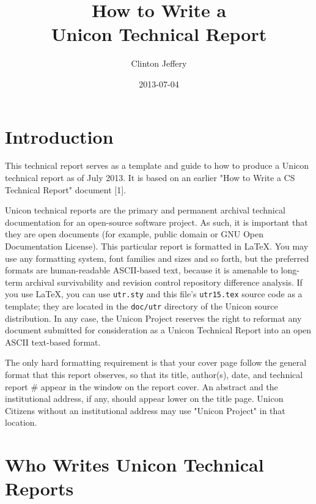\documentclass[letterpaper,12pt]{article}
\title{How to Write a \\ Unicon Technical Report}
\author{Clinton Jeffery}
\date{2013-07-04}
\begin{document}
\maketitle

\section{Introduction}

This technical report serves as a template and guide to how to produce
a Unicon technical report as of July 2013. It is based on an earlier
"How to Write a CS Technical Report" document [1].

Unicon technical reports are the primary and permanent archival
technical documentation for an open-source software project. As such,
it is important that they are open documents (for example, public
domain or GNU Open Documentation License).  This particular report is
formatted in LaTeX. You may use any formatting system, font families
and sizes and so forth, but the preferred formats are human-readable
ASCII-based text, because it is amenable to long-term archival
survivability and revision control repository difference analysis.
If you use LaTeX, you can use \texttt{utr.sty} and this file's
\texttt{utr15.tex} source code as a template; they are located in the
\texttt{doc/utr} directory of the Unicon source distribution.  In any
case, the Unicon Project reserves the right to reformat any document
submitted for consideration as a Unicon Technical Report into an open
ASCII text-based format.

The only hard formatting requirement is that your cover page follow
the general format that this report observes, so that its title,
author(s), date, and technical report \# appear in the window on the
report cover. An abstract and the institutional address, if any,
should appear lower on the title page.  Unicon Citizens without an
institutional address may use "Unicon Project" in that location.

\section{Who Writes Unicon Technical Reports}
\end{document}
